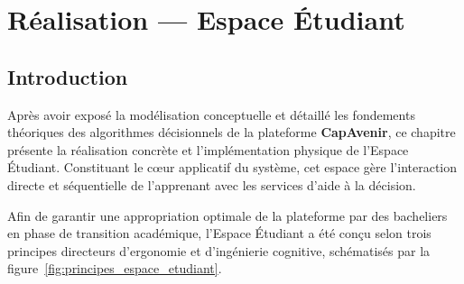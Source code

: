 
\chapter{Réalisation — Espace Étudiant}
\label{chap:realisation_etudiant}

\section*{Introduction}

Après avoir exposé la modélisation conceptuelle et détaillé les fondements théoriques des algorithmes décisionnels de la plateforme \textbf{CapAvenir}, ce chapitre présente la réalisation concrète et l'implémentation physique de l'Espace Étudiant. Constituant le cœur applicatif du système, cet espace gère l'interaction directe et séquentielle de l'apprenant avec les services d'aide à la décision. 

Afin de garantir une appropriation optimale de la plateforme par des bacheliers en phase de transition académique, l'Espace Étudiant a été conçu selon trois principes directeurs d'ergonomie et d'ingénierie cognitive, schématisés par la figure~\ref{fig:principes_espace_etudiant}.

